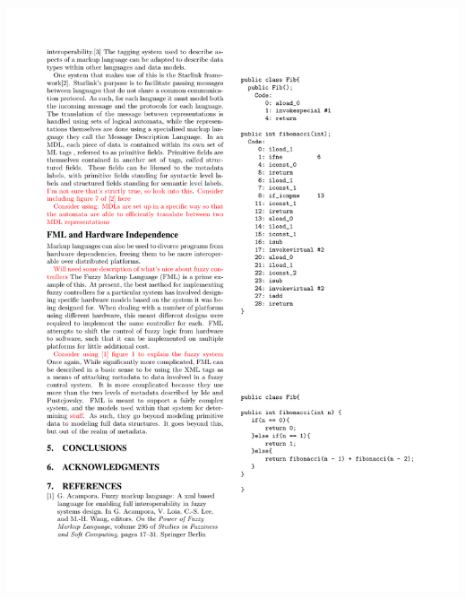 \documentclass{beamer}
\begin{document}
\begin{frame}[fragile]
\begin{columns}
  \begin{column}{0.4\textwidth}
  \includegraphics[scale=0.8]{graphics/bytecodeFib.pdf}
  \end{column}
  \end{columns}
\end{frame}
\end{document}
